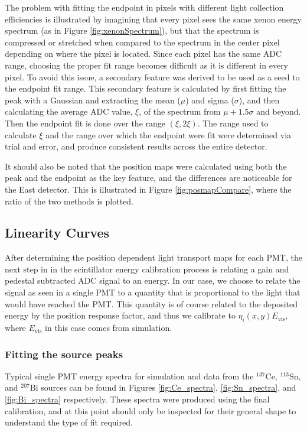 The problem with fitting the endpoint in pixels with different light collection efficiencies is illustrated by
imagining that every pixel sees the same xenon energy spectrum (as in Figure \ref{fig:xenonSpectrum}), but that
the spectrum is compressed or stretched when compared to the spectrum in the center pixel depending on where
the pixel is located. Since each pixel has the same ADC range, choosing the proper fit range becomes difficult
as it is different in every pixel. To avoid this issue, a secondary feature was derived to be used as a
seed to the endpoint fit range. This secondary feature is calculated by first fitting the peak with a Gaussian
and extracting the mean ($\mu$) and sigma ($\sigma$), and then calculating the average ADC value, $\xi$, of the spectrum
from $\mu+1.5\sigma$ and beyond. Then the endpoint fit is done over the range $(\xi,2\xi)$. The range used to
calculate $\xi$ and the range over which the endpoint were fit were determined via trial and error, and produce
consistent results across the entire detector.

It should also be noted that the position maps were calculated using both the peak and the endpoint as the key
feature, and the differences are noticeable for the East detector. This is illustrated in Figure \ref{fig:posmapCompare}, where the
ratio of the two methods is plotted.



\subsection{Linearity Curves}
After determining the position dependent light transport maps for each PMT,
the next step in in the scintillator energy calibration process is relating a gain and pedestal subtracted ADC signal
to an energy. In our case, we choose to relate the signal as seen in a single PMT to a quantity that is
proportional to the light that would have reached the PMT. This quantity is of course related to the deposited
energy by the position response factor, and thus we calibrate to $\eta_i(x,y)E_{\mathrm{vis}}$, where $E_{\mathrm{vis}}$ in this
case comes from simulation.

\subsubsection{Fitting the source peaks}
Typical single PMT energy spectra for simulation and data from the $^{137}\mathrm{Ce}$, $^{113}\mathrm{Sn}$, and $^{207}\mathrm{Bi}$ sources can be
found in Figures \ref{fig:Ce_spectra}, \ref{fig:Sn_spectra}, and \ref{fig:Bi_spectra} respectively. These spectra were produced using the final
calibration, and at this point should only be inspected for their general shape to understand the type of fit required.

